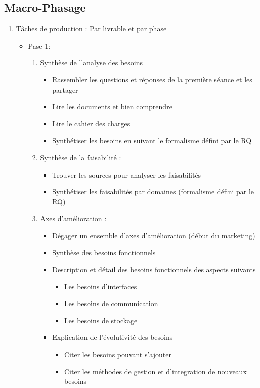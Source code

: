\subsection{Macro-Phasage}
\begin{enumerate}
\item Tâches de production :
    Par livrable et par phase 
    \begin{itemize}
    \item Pase 1:
    \begin{enumerate}
    \item Synthèse de l'analyse des besoins 
    \begin{itemize}
			\item Rassembler les questions et réponses de la première séance et les partager
			\item Lire les documents et bien comprendre
			\item Lire le cahier des charges 
			\item Synthétiser les besoins en suivant le formalisme défini par le RQ
			\end{itemize}
	\item Synthèse de la faisabilité :
	\begin{itemize}
			\item Trouver les sources pour analyser les faisabilités
			\item Synthétiser les faisabilités par domaines (formalisme défini par le RQ)
			
			\end{itemize}
	\item Axes d'amélioration :
	\begin{itemize}
		    \item Dégager un ensemble d'axes d'amélioration (début du marketing)
	        \item Synthèse des besoins fonctionnels 	       
	        \item Description et détail des besoins fonctionnels des aspects suivants
	        \begin{itemize}
	            \item Les besoins d'interfaces
	            \item Les besoins de communication
	            \item Les besoins de stockage
	        \end{itemize}
	        \item Explication de l'évolutivité des besoins
	        \begin{itemize}
	            \item Citer les besoins pouvant s'ajouter
	            \item Citer les méthodes de gestion et d'integration de nouveaux besoins
	        \end{itemize}
	        

\end{itemize}
\end{enumerate}
\end{itemize}
\end{enumerate}
